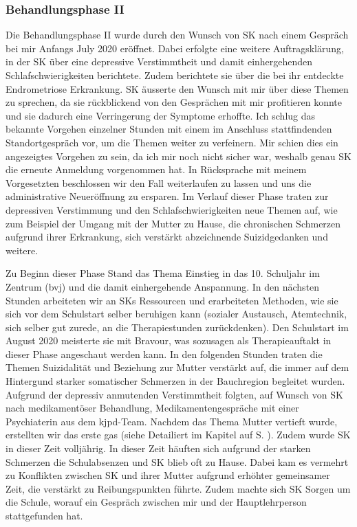 \subsubsection{Behandlungsphase II}
Die Behandlungsphase II wurde durch den Wunsch von SK nach einem Gespräch bei mir Anfangs July 2020 eröffnet. Dabei erfolgte eine weitere Auftragsklärung, in der SK über eine depressive Verstimmtheit und damit einhergehenden Schlafschwierigkeiten berichtete. Zudem berichtete sie über die bei ihr entdeckte Endrometriose Erkrankung. SK äusserte den Wunsch mit mir über diese Themen zu sprechen, da sie rückblickend von den Gesprächen mit mir profitieren konnte und sie dadurch eine Verringerung der Symptome erhoffte. Ich schlug das bekannte Vorgehen einzelner Stunden mit einem im Anschluss stattfindenden Standortgespräch vor, um die Themen weiter zu verfeinern. Mir schien dies ein angezeigtes Vorgehen zu sein, da ich mir noch nicht sicher war, weshalb genau SK die erneute Anmeldung vorgenommen hat. In Rücksprache mit meinem Vorgesetzten beschlossen wir den Fall weiterlaufen zu lassen und uns die administrative Neueröffnung zu ersparen. Im Verlauf dieser Phase traten zur depressiven Verstimmung und den Schlafschwierigkeiten neue Themen auf, wie zum Beispiel der Umgang mit der Mutter zu Hause, die chronischen Schmerzen aufgrund ihrer Erkrankung, sich verstärkt abzeichnende Suizidgedanken und weitere.

Zu Beginn dieser Phase Stand das Thema Einstieg in das 10. Schuljahr im Zentrum (\ac{bvj}) und die damit einhergehende Anspannung. In den nächsten Stunden arbeiteten wir an SKs Ressourcen und erarbeiteten Methoden, wie sie sich vor dem Schulstart selber beruhigen kann (sozialer Austausch, Atemtechnik, sich selber gut zurede, an die Therapiestunden zurückdenken). Den Schulstart im August 2020 meisterte sie mit Bravour, was sozusagen als Therapieauftakt in dieser Phase angeschaut werden kann. In den folgenden Stunden traten die Themen Suizidalität und Beziehung zur Mutter verstärkt auf, die immer auf dem Hintergund starker somatischer Schmerzen in der Bauchregion begleitet wurden. Aufgrund der depressiv anmutenden Verstimmtheit folgten, auf Wunsch von SK nach medikamentöser Behandlung, Medikamentengespräche mit einer Psychiaterin aus dem \ac{kjpd}-Team. Nachdem das Thema Mutter vertieft wurde, erstellten wir das erste \ac{gas} (siehe Detailiert im Kapitel  auf S. \pageref{sec:Evaluationsverfahren}). Zudem wurde SK in dieser Zeit volljährig. In dieser Zeit häuften sich aufgrund der starken Schmerzen die Schulabsenzen und SK blieb oft zu Hause. Dabei kam es vermehrt zu Konflikten zwischen SK und ihrer Mutter aufgrund erhöhter gemeinsamer Zeit, die verstärkt zu Reibungspunkten führte. Zudem machte sich SK Sorgen um die Schule, worauf ein Gespräch zwischen mir und der Hauptlehrperson stattgefunden hat. 

